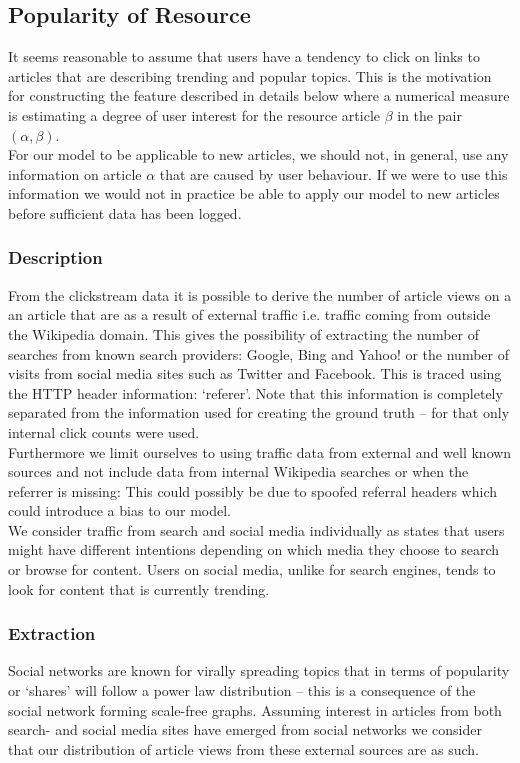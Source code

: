 \subsection{Popularity of Resource}
It seems reasonable to assume that users have a tendency to click on links to articles that are describing trending and popular topics. This is the motivation for constructing the feature described in details below where a numerical measure is estimating a degree of user interest for the resource article $\beta$ in the pair $(\alpha, \beta)$. \\

For our model to be applicable to new articles, we should not, in general, use any information on article $\alpha$ that are caused by user behaviour. If we were to use this information we would not in practice be able to apply our model to new articles before sufficient data has been logged. 


\subsubsection{Description}
From the clickstream data it is possible to derive the number of article views on a an article that are as a result of external traffic i.e. traffic coming from outside the Wikipedia domain. This gives the possibility of extracting the number of searches from known search providers: Google, Bing and Yahoo! or the number of visits from social media sites such as Twitter and Facebook. This is traced using the HTTP header information: `referer'. Note that this information is completely separated from the information used for creating the ground truth -- for that only internal click counts were used.\\

Furthermore we limit ourselves to using traffic data from external and well known sources and not include data from internal Wikipedia searches or when the referrer is missing: This could possibly be due to spoofed referral headers which could introduce a bias to our model.\\

We consider traffic from search and social media individually as \cite{teevan2011twittersearch} states that users might have different intentions depending on which media they choose to search or browse for content. Users on social media, unlike for search engines, tends to look for content that is currently trending.

\subsubsection{Extraction}
Social networks are known for virally spreading topics that in terms of popularity or `shares' will follow a power law distribution \cite{jain2014scalable} -- this is a consequence of the social network forming scale-free graphs. Assuming interest in articles from both search- and social media sites have emerged from social networks we consider that our distribution of article views from these external sources are as such. \\

